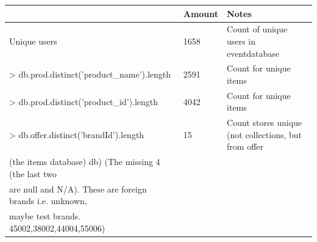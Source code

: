 \begin{table}
    \begin{tabular}{l|l|l}
    ~                                                 & Amount                                                                                                                                                                                            & Notes                                                                                                                                                                                                                \\ \hline
    Unique users                                      & 1658                                                                                                                                                                                              & Count of unique users in eventdatabase                                                                                                                                                                               \\ \hline
    > db.prod.distinct('product\_name').length & 2591                                                                                                                                                                                              & Count for unique items                                                                                                                                                                                               \\ \hline
    > db.prod.distinct('product\_id').length & 4042                                                                                                                                                                                              & Count for unique items                                                                                                                                                                                               \\ \hline
    > db.offer.distinct('brandId').length             & 15                                                                                                                                                                                                & Count stores unique (not collections, but from offer\\(the items database) db)  (The missing 4 (the last two\\are null and N/A). These are foreign brands i.e. unknown,\\maybe test brands. 45002,38002,44004,55006) \\ \hline

\end{tabular}
\end{table}
